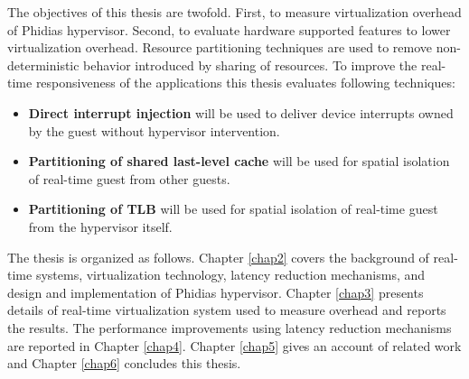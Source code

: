 The objectives of this thesis are twofold. First, to measure virtualization overhead of Phidias hypervisor.
Second, to evaluate hardware supported features to lower virtualization overhead.
Resource partitioning techniques are used to remove non-deterministic behavior introduced by sharing of resources.
To improve the real-time responsiveness of the applications this thesis evaluates following techniques:
\begin{itemize}
\item \textbf{Direct interrupt injection} will be used to deliver device interrupts owned by the guest without hypervisor intervention.
\item \textbf{Partitioning of shared last-level cache} will be used for spatial isolation of real-time guest from other guests.
\item \textbf{Partitioning of TLB} will be used for spatial isolation of real-time guest from the hypervisor itself.
\end{itemize}


The thesis is organized as follows. 
Chapter \ref{chap2} covers the background of real-time systems, virtualization technology, latency reduction mechanisms, and 
design and implementation of Phidias hypervisor.
Chapter \ref{chap3} presents details of real-time virtualization system used to measure overhead and reports the results.
The performance improvements using latency reduction mechanisms are reported in Chapter \ref{chap4}.
Chapter \ref{chap5} gives an account of related work and Chapter \ref{chap6} concludes this thesis.
